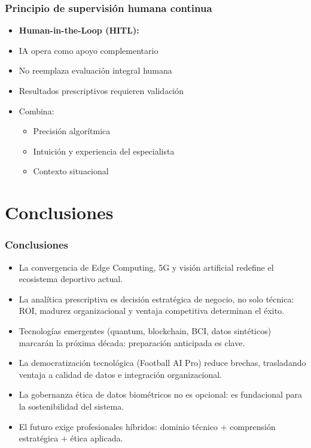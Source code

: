 \documentclass[aspectratio=169]{beamer}
\begin{document}
\begin{frame}\frametitle{Principio de supervisión humana continua}
\begin{itemize}
    \item \textbf{Human-in-the-Loop (HITL):}
    \item IA opera como apoyo complementario
    \item No reemplaza evaluación integral humana
    \item Resultados prescriptivos requieren validación
    \item Combina:
    \begin{itemize}
        \item Precisión algorítmica
        \item Intuición y experiencia del especialista
        \item Contexto situacional
    \end{itemize}
\end{itemize}
\end{frame}

\section*{Conclusiones}
\frame{\sectionpage}

\begin{frame}\frametitle{Conclusiones}
\begin{itemize}
    \item La convergencia de Edge Computing, 5G y visión artificial redefine el ecosistema deportivo actual.
    \item La analítica prescriptiva es decisión estratégica de negocio, no solo técnica: ROI, madurez organizacional y ventaja competitiva determinan el éxito.
    \item Tecnologías emergentes (quantum, blockchain, BCI, datos sintéticos) marcarán la próxima década: preparación anticipada es clave.
    \item La democratización tecnológica (Football AI Pro) reduce brechas, trasladando ventaja a calidad de datos e integración organizacional.
    \item La gobernanza ética de datos biométricos no es opcional: es fundacional para la sostenibilidad del sistema.
    \item El futuro exige profesionales híbridos: dominio técnico $+$ comprensión estratégica $+$ ética aplicada.
\end{itemize}
\end{frame}
\end{document}
